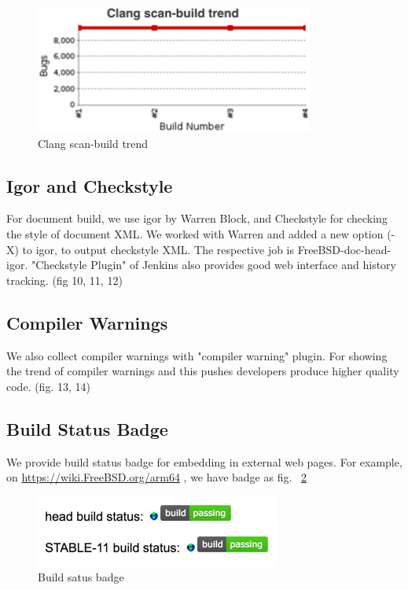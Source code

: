 \documentclass[a4paper,twocolumn,10pt]{article}
\begin{document}
\begin{figure}
\includegraphics{clang-scan-build-trend.png}
\caption{Clang scan-build trend}
\label{clang-scan-build-trend}
\end{figure}

\subsection{Igor and Checkstyle}

For document build, we use igor by Warren Block, and Checkstyle for checking
the style of document XML. We worked with Warren and added a new option (-X) to
igor, to output checkstyle XML. The respective job is FreeBSD-doc-head-igor.
"Checkstyle Plugin" of Jenkins also provides good web interface and history
tracking. (fig 10, 11, 12)

\subsection{Compiler Warnings}

We also collect compiler warnings with "compiler warning" plugin. For showing
the trend of compiler warnings and this pushes developers produce higher
quality code. (fig. 13, 14)

\subsection{Build Status Badge}

We provide build status badge for embedding in external web pages. For example,
on \url{https://wiki.FreeBSD.org/arm64} , we have badge as fig.
~\ref{build-status-badge}

\begin{figure}
\includegraphics{build-status-badge.png}
\caption{Build satus badge}
\label{build-status-badge}
\end{figure}
\end{document}
